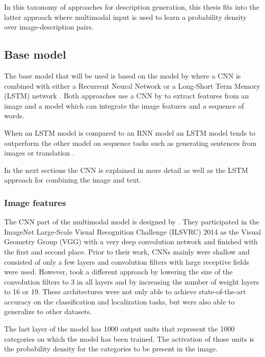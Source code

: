 In this taxonomy of approaches for description generation, this thesis fits into the latter approach where multimodal input is used to learn a probability density over image-description pairs.

\subsection{Base model}
The base model that will be used is based on the model by \citeauthor{karpathyfeifei2014deep} where a CNN is combined with either a Recurrent Neural Network \cite{karpathyfeifei2014deep} or a Long-Short Term Memory (LSTM) network \cite{vinyals2014show}. Both approaches use a CNN by \citeauthor{simonyan2014very} \cite{simonyan2014very} to extract features from an image and a model which can integrate the image features and a sequence of words.  

When an LSTM model is compared to an RNN model an LSTM model tends to outperform the other model on sequence tasks such as generating sentences from images or translation \cite{vinyals2014show}. 

In the next sections the CNN is explained in more detail as well as the LSTM approach for combining the image and text.

\subsubsection{Image features}
The CNN part of the multimodal model is designed by \citeauthor{simonyan2014very}. They participated in the ImageNet Large-Scale Visual Recognition Challenge (ILSVRC) 2014 as the Visual Geometry Group (VGG) with a very deep convolution network and finished with the first and second place. Prior to their work, CNNs mainly were shallow and consisted of only a few layers and convolution filters with large receptive fields were used. However, \citeauthor{simonyan2014very} took a different approach by lowering the size of the convolution filters to 3 in all layers and by increasing the number of weight layers to 16 or 19. These architectures were not only able to achieve state-of-the-art accuracy on the classification and localization tasks, but were also able to generalize to other datasets.

The last layer of the model has 1000 output units that represent the 1000 categories on which the model has been trained. The activation of those units is the probability density for the categories to be present in the image. 

